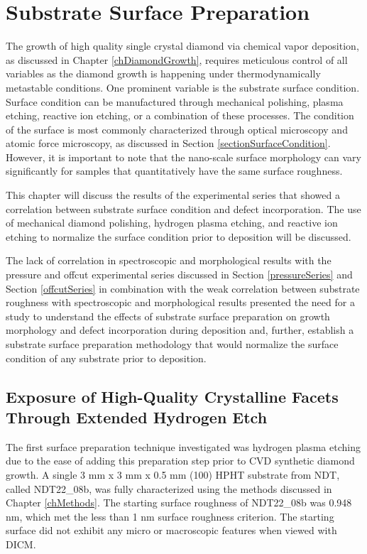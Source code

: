 \chapter{Substrate Surface Preparation}
\label{chSurfacePrep}
\indent

The growth of high quality single crystal diamond via chemical vapor deposition, as discussed in Chapter \ref{chDiamondGrowth}, requires meticulous control of all variables as the diamond growth is happening under thermodynamically metastable conditions. One prominent variable is the substrate surface condition. Surface condition can be manufactured through mechanical polishing, plasma etching, reactive ion etching, or a combination of these processes. The condition of the surface is most commonly characterized through optical microscopy and atomic force microscopy, as discussed in Section \ref{sectionSurfaceCondition}. However, it is important to note that the nano-scale surface morphology can vary significantly for samples that quantitatively have the same surface roughness.

This chapter will discuss the results of the experimental series that showed a correlation between substrate surface condition and defect incorporation. The use of mechanical diamond polishing, hydrogen plasma etching, and reactive ion etching to normalize the surface condition prior to deposition will be discussed.

The lack of correlation in spectroscopic and morphological results with the pressure and offcut experimental series discussed in Section \ref{pressureSeries} and Section \ref{offcutSeries} in combination with the weak correlation between substrate roughness with spectroscopic and morphological results presented the need for a study to understand the effects of substrate surface preparation on growth morphology and defect incorporation during deposition and, further, establish a substrate surface preparation methodology that would normalize the surface condition of any substrate prior to deposition.


\section{Exposure of High-Quality Crystalline Facets Through Extended Hydrogen Etch}
\indent

The first surface preparation technique investigated was hydrogen plasma etching due to the ease of adding this preparation step prior to CVD synthetic diamond growth. A single 3 mm x 3 mm x 0.5 mm (100) HPHT substrate from NDT, called NDT22\_08b, was fully characterized using the methods discussed in Chapter \ref{chMethods}. The starting surface roughness of NDT22\_08b was 0.948 nm, which met the less than 1 nm surface roughness criterion. The starting surface did not exhibit any micro or macroscopic features when viewed with DICM. 

